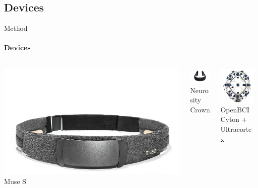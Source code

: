 \documentclass[xcolor={dvipsnames,table},12pt]{beamer}
\begin{document}
\subsection{Devices}
\begin{frame}{Method}
    \framesubtitle{Devices}

    \begin{columns}
        \begin{column}{0.33\textwidth}
            \vspace{9mm}
            \centering
            \includegraphics[trim=0 -50 0 200,clip,width=\textwidth]{./img/Muse-S.jpg}
            \\ Muse S
        \end{column}

        \begin{column}{0.33\textwidth}
            \vspace{4mm}
            \centering
            \includegraphics[trim=200 150 200 100,clip,width=3cm]{./img/crown-1.png}
            \\ Neurosity Crown
        \end{column}

        \begin{column}{0.33\textwidth}
            \centering
            \includegraphics[width=3cm]{./img/openbci-cyton.jpg}
            \\ OpenBCI Cyton + Ultracortex
        \end{column}
    \end{columns}

    \vspace{-5mm}
    \begin{adjustbox}{width=\textwidth,center,float=table}
        
    \end{adjustbox}
\end{frame}
\end{document}
